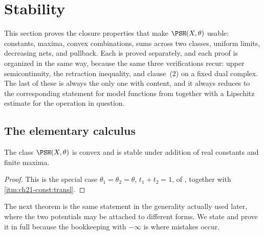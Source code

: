 \section{Stability}
\label{sec:ch21-stability}

This section proves the closure properties that make
$\PSH(X,\theta)$ usable: constants, maxima, convex combinations, sums
across two classes, uniform limits, decreasing nets, and pullback.  Each is
proved separately, and each proof is organized in the same way, because the
same three verifications recur: upper semicontinuity, the retraction
inequality, and clause~(2) on a fixed dual complex.  The last of these is
always the only one with content, and it always reduces to the corresponding
statement for model functions from  together with
a Lipschitz estimate for the operation in question.

\subsection{The elementary calculus}
\label{sec:ch21-elementary-calculus}

\begin{proposition}\label{prop:ch21-elementary-stability}
The class $\PSH(X,\theta)$ is convex and is stable under addition of real
constants and finite maxima.
\end{proposition}

\begin{proof}
This is the special case $\theta_1=\theta_2=\theta$,
$t_1+t_2=1$, of , together with
\,\cref{itm:ch21-const:transl}.
\end{proof}

The next theorem is the same statement in the generality actually used
later, where the two potentials may be attached to different forms.  We
state and prove it in full because the bookkeeping with $-\infty$ is where
mistakes occur.

